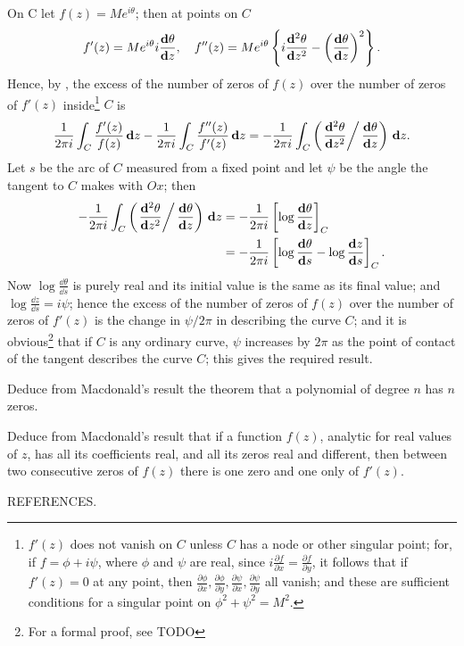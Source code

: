 On C let $f(z) = M e^{i\theta}$; then at points on $C$
$$
f'(z) = M e^{i\theta} i \frac{\mathbf{d} \theta}{\mathbf{d} z},
\quad
f''(z)
=
M e^{i\theta}
\left\{ 
  i \frac{ \mathbf{d}^{2} \theta }{ \mathbf{d} z^{2} }
  -
  \left(  \frac{\mathbf{d} \theta}{\mathbf{d} z}  \right)^{2}
 \right\}.
$$
Hence, by , the excess of the number of zeros
of $f(z)$ over the number of zeros of $f'(z)$
inside\footnote{$f'(z)$ does not vanish on $C$ unless $C$ has a node
  or other singular point; for, if $f = \phi + i\psi$,
  where $\phi$ and $\psi$ are real, since
  $i \frac{\partial f}{\partial x} = \frac{\partial f}{\partial y}$,
  it follows that if $f'(z) = 0$ at any point, then
  $\frac{\partial \phi}{\partial x},
  \frac{\partial \phi}{\partial y},
  \frac{\partial \psi}{\partial x},
  \frac{\partial \psi}{\partial y}$
  all vanish; and these are sufficient conditions for a singular point
  on  $\phi^{2} + \psi^{2} = M^{2}$.
} $C$ is
$$
\frac{1}{2\pi i} 
\int_{C} \frac{ f'(z) }{f(z)} \, \mathbf{d} z
-
\frac{1}{2\pi i}
\int_{C} \frac{ f''(z) }{ f'(z) } \, \mathbf{d} z
=
-\frac{1}{2 \pi i}
\int_{C} \left( 
  \left.
    \frac{ \mathbf{d}^{2} \theta }{ \mathbf{d} z^{2} }
  \right/
  \frac{\mathbf{d}\theta}{\mathbf{d} z}
   \right) \, \mathbf{d} z.
$$
Let $s$ be the arc of $C$ measured from a fixed point and let $\psi$
be the angle the tangent to $C$ makes with $Ox$; then
\begin{align*}
-\frac{1}{2 \pi i}
\int_{C} \left( 
  \left.
    \frac{ \mathbf{d}^{2} \theta }{ \mathbf{d} z^{2} }
  \right/
  \frac{\mathbf{d}\theta}{\mathbf{d} z}
   \right) \, \mathbf{d} z
  &=
  - \frac{1}{2 \pi i}
  \left[  \log \frac{\mathbf{d}\theta}{\mathbf{d} z}  \right]_{C}
  \\
  &=
  - \frac{1}{2 \pi i}
  \left[ 
    \log \frac{\mathbf{d}\theta}{\mathbf{d} s}
    -
    \log \frac{\mathbf{d} z}{\mathbf{d} s}
   \right]_{C}
  .
\end{align*}
Now $\log \frac{\dd \theta}{\dd s}$ is purely real and its initial
value is the same as its final value; and
$\log \frac{\dd z}{\dd s} = i \psi$; hence the excess of the number of
zeros of $f(z)$ over the number of zeros of
$f'(z)$ is the change in $\psi/2\pi$ in describing the curve $C$; and it is
obvious\footnote{For a formal proof, see TODO} that if $C$ is any
ordinary curve, $\psi$ increases by $2\pi$ as the point of contact of
the tangent describes the curve $C$; this gives the required result.
\begin{wandwexample}
  Deduce from Macdonald's result the theorem that a
  polynomial of degree $n$ has $n$ zeros.
\end{wandwexample}
\begin{wandwexample}
  Deduce from Macdonald's result that if a function $f(z)$,
  analytic for real values of $z$, has all its coefficients real, and all
  its zeros real and different, then between two consecutive zeros of
  $f(z)$ there is one zero and one only of $f'(z)$.
\end{wandwexample}
REFERENCES.

